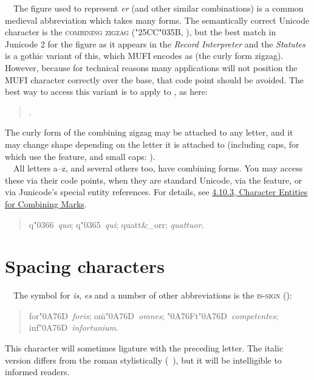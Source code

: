 \noindent{}\ \ The figure used to represent \textit{er\textup{ }}(and other similar combinations) is a common medieval
abbreviation which takes many forms. The semantically correct Unicode character is the \textsc{combining
zigzag} (\char"25CC\char"035B, ), but the best match in Junicode 2 for the figure as it appears in the
\textit{Record Interpreter} and the \textit{Statutes} is a gothic variant of this, which MUFI
encodes as  (the curly form zigzag). However, because for technical reasons many applications will not position
the MUFI character correctly over the base, that code point should be avoided. The best way to access this variant is
to apply  to , as here:
\begin{quote}
.
\end{quote}
The curly form of the combining zigzag may be attached to any letter, and it may change shape depending on the letter it
is attached to (including caps, for which use the  feature, and small caps:
).\\[1ex]

\noindent{}\ \ All letters a--z, and several others too, have combining forms.
You may access these via their code points, when they are standard Unicode, via the
 feature, or via
Junicode's special entity references. For details, see \hyperlink{ss10}{4.10.3, Character Entities
for Combining Marks}.
\begin{quote}
q\char"0366\ \textit{quo}; q\char"0365\ \textit{qui}; quatt\&\_orr; \textit{quattuor}.
\end{quote}
\section{Spacing characters}
\ \ The symbol for \textit{is}, \textit{es} and a number of other abbreviations is the
\textsc{is-sign} ():
\begin{quote}
for\char"0A76D\ \textit{foris}; o\={m}\char"0A76D\ \textit{omnes}; \char"0A76Ft\char"0A76D\
\textit{competentes}; inf\char"0A76D\ \textit{infortunium}.
\end{quote}
This character will sometimes ligature with the preceding letter. The italic version differs from the roman
stylistically (\ ), but it will be
intelligible to informed readers.\\[1ex]

